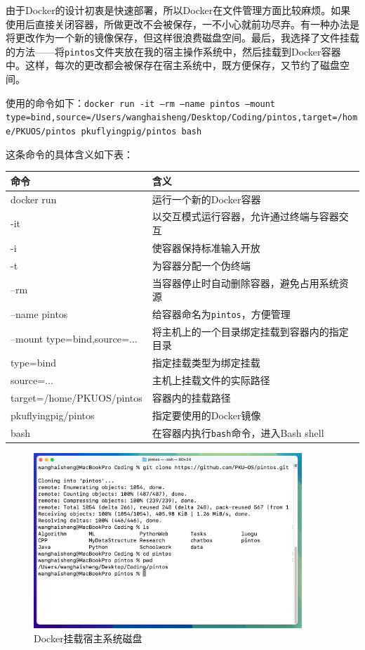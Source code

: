 \documentclass{article}
\begin{document}
由于Docker的设计初衷是快速部署，所以Docker在文件管理方面比较麻烦。如果使用后直接关闭容器，所做更改不会被保存，一不小心就前功尽弃。有一种办法是将更改作为一个新的镜像保存，但这样很浪费磁盘空间。最后，我选择了文件挂载的方法——将\texttt{pintos}文件夹放在我的宿主操作系统中，然后挂载到Docker容器中。这样，每次的更改都会被保存在宿主系统中，既方便保存，又节约了磁盘空间。

使用的命令如下：\texttt{docker run -it --rm --name pintos --mount type=bind,source=/Users/wanghaisheng/Desktop/Coding/pintos,target=/home/PKUOS/pintos pkuflyingpig/pintos bash}

这条命令的具体含义如下表：

\begin{center}
	\begin{tabular}{| >{\centering\arraybackslash}m{6cm} | >{\centering\arraybackslash}m{9cm} |}  
		\hline  
		\textbf{命令} & \textbf{含义} \\  
		\hline  
		docker run & 运行一个新的Docker容器 \\  
		\hline  
		-it & 以交互模式运行容器，允许通过终端与容器交互 \\  
		\hline  
		-i & 使容器保持标准输入开放 \\  
		\hline  
		-t & 为容器分配一个伪终端 \\  
		\hline  
		--rm & 当容器停止时自动删除容器，避免占用系统资源 \\  
		\hline  
		--name pintos & 给容器命名为\texttt{pintos}，方便管理 \\  
		\hline  
		--mount type=bind,source=... & 将主机上的一个目录绑定挂载到容器内的指定目录 \\  
		\hline  
		type=bind & 指定挂载类型为绑定挂载 \\  
		\hline  
		source=... & 主机上挂载文件的实际路径 \\  
		\hline  
		target=/home/PKUOS/pintos & 容器内的挂载路径 \\  
		\hline  
		pkuflyingpig/pintos & 指定要使用的Docker镜像 \\  
		\hline  
		bash & 在容器内执行\texttt{bash}命令，进入Bash shell \\  
		\hline  
	\end{tabular}
\end{center}

\begin{figure}[H]
	\centering
	\includegraphics[width=0.9\textwidth]{img/docker_load.png}
	\caption{Docker挂载宿主系统磁盘}
\end{figure}
\end{document}
